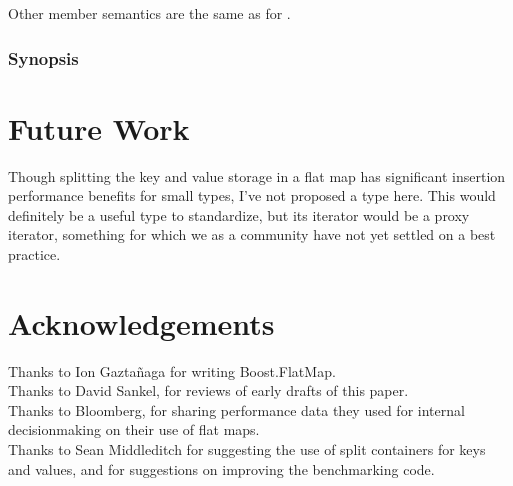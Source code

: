 Other member semantics are the same as for .

\subsubsection{ Synopsis}




\section{Future Work}

Though splitting the key and value storage in a flat map has significant
insertion performance benefits for small types, I've not proposed a
 type here.  This would definitely be a useful type to
standardize, but its iterator would be a proxy iterator, something for which
we as a community have not yet settled on a best practice.


\section{Acknowledgements}

Thanks to Ion Gazta\~{n}aga for writing Boost.FlatMap.\\

Thanks to David Sankel, for reviews of early drafts of this paper.\\

Thanks to Bloomberg, for sharing performance data they used for internal
decisionmaking on their use of flat maps.\\

Thanks to Sean Middleditch for suggesting the use of split containers for keys
and values, and for suggestions on improving the benchmarking code.
